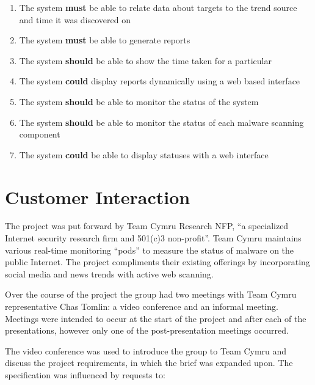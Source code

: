 \begin{enumerate}
    \item The system \textbf{must} be able to relate data about targets to the
    trend source and time it was discovered on
    \item The system \textbf{must} be able to generate reports
    \item The system \textbf{should} be able to show the time taken for a particular
    \item The system \textbf{could} display reports dynamically using a web based interface
    \item The system \textbf{should} be able to monitor the status of the system
    \item The system \textbf{should} be able to monitor the status of each malware scanning component
    \item The system \textbf{could} be able to display statuses with a web interface
\end{enumerate}

\section{Customer Interaction} The project was put forward by Team Cymru
Research NFP, ``a specialized Internet security research firm and 501(c)3
non-profit''\cite{team-cymru}. Team Cymru maintains various real-time monitoring
``pods'' to measure the status of malware on the public Internet. The project
compliments their existing offerings by incorporating social media and news
trends with active web scanning.

Over the course of the project the group had two meetings with Team Cymru
representative Chas Tomlin: a video conference and an informal meeting.
Meetings were intended to occur at the start of the project and after each of
the presentations, however only one of the post-presentation meetings occurred.

The video conference was used to introduce the group to Team Cymru and discuss
the project requirements, in which the brief was expanded upon. The
specification was influenced by requests to: 

